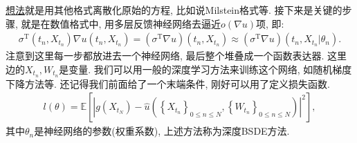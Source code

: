 \href{https://blog.csdn.net/lusongno1/article/details/83867550}{想法}就是用其他格式离散化原始的方程, 比如说Milstein格式等.
接下来是关键的步骤, 就是在数值格式中, 用多层反馈神经网络去逼近$o(\nabla u)$项, 即:
\begin{align}\label{DNNPDE20191218eq07}
\sigma^{\mathrm{T}}\left(t_{n},  X_{t_{n}}\right) \nabla u\left(t_{n},  X_{t_{n}}\right)=\left(\sigma^{\mathrm{T}} \nabla u\right)\left(t_{n},  X_{t_{n}}\right) \approx\left(\sigma^{\mathrm{T}} \nabla u\right)\left(t_{n},  X_{t_{n}} | \theta_{n}\right).
\end{align}
注意到\label{DNNPDE20191218eq05}这里每一步都放进去一个神经网络, 最后整个堆叠成一个函数表达器. 这里边的$X_{t_{n}},  W_{t_{n}}$是变量. 我们可以用一般的深度学习方法来训练这个网络, 如随机梯度下降方法等.
还记得我们前面给了一个末端条件, 刚好可以用了定义损失函数.
\begin{align}\label{DNNPDE20191218eq08}
  l(\theta)=\mathbb{E}\left[\left|g\left(X_{t_{N}}\right)-\hat{u}\left(\left\{X_{t_{n}}\right\}_{0 \leq n \leq N}, \left\{W_{t_{n}}\right\}_{0 \leq n \leq N}\right)\right|^{2}\right],
\end{align}
其中$\theta_n$是神经网络的参数(权重系数), 上述方法称为深度BSDE方法.
